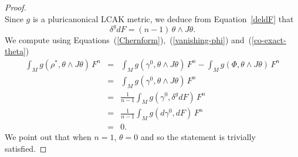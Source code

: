 \documentclass[a4paper,11pt]{amsart}
\theoremstyle{definition}
\renewcommand{\[}{\begin{equation*}}
\renewcommand{\]}{\end{equation*}}
\begin{document}
\begin{proof}
\begin{equation}
\end{equation}
Since $g$ is a pluricanonical LCAK metric, we deduce from Equation~\ref{deldF} that
\begin{equation}\label{co-exact-theta}
\delta^gdF=(n-1)\,\theta\wedge J\theta.
\end{equation}
We compute using Equations~(\ref{Chernform}),~(\ref{vanishing-phi}) and~(\ref{co-exact-theta})
\begin{eqnarray*}
\int_M g(\rho^\ast,\theta\wedge J\theta)\,F^n&=&\int_M g(\gamma^0,\theta\wedge J\theta)\,F^n-\int_M g(\Phi,\theta\wedge J\theta)\,F^n\\
&=&\int_M g(\gamma^0,\theta\wedge J\theta)\,F^n\\
&=&\frac{1}{n-1}\int_M g(\gamma^0,\delta^gdF)\,F^n\\
&=&\frac{1}{n-1}\int_M g(d\gamma^0,dF)\,F^n\\
&=&0.
\end{eqnarray*}
We point out that when $n=1$, $\theta=0$ and so the statement is trivially satisfied. 
 \end{proof}
\end{document}
